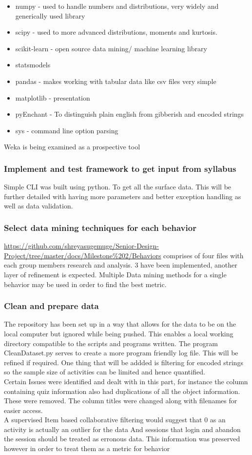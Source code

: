 \documentclass[12pt]{article}
\begin{document}
		\begin{itemize}
			\item numpy - used to handle numbers and distributions, very widely and generically used library
			\item scipy - used to more advanced distributions, moments and kurtosis.
			\item scikit-learn - open source data mining/ machine learning library
			\item statsmodels 
			\item pandas - makes working with tabular data like csv files very simple
			\item matplotlib - presentation
			\item pyEnchant  - To distinguish plain english from gibberish and encoded strings
			\item sys - command line option parsing
		\end{itemize}
		Weka is being examined as a prospective tool
		
		\subsubsection{Implement and test framework to get input from syllabus}
		Simple CLI was built using python. To get all the surface data. This will be further detailed with having more parameters and better exception handling as well as data validation.
		\subsubsection{Select data mining techniques for each behavior}
		\url{https://github.com/shreyasugemuge/Senior-Design-Project/tree/master/docs/Milestone\%202/Behaviors} comprises of four files with each group members research and analysis. 3 have been implemented, another layer of refinement is expected. Multiple Data mining methods for a single behavior may be used in order to find the best metric.
		\subsubsection{Clean and prepare data}
		The repository has been set up in a way that allows for the data to be on the local computer but ignored while being pushed. This enables a local working directory compatible to the scripts and programs written. The program CleanDataset.py serves to create a more program friendly log file. This will be refined if required. One thing that will be addded is filtering for encoded strings so the sample size of activities can be limited and hence quantified.  \\ \hfil \break
		Certain Issues were identified and dealt with in this part, for instance the column containing quiz information also had duplications of all the object information. These were removed. The column titles were changed along with filenames for easier access. \\ \hfil \break
		A supervised Item based collaborative filtering would suggest that 0 as an activity is actually an outlier for the data And sessions that login and abandon the session should be treated as erronous data. This information was preserved however in order to treat them as a metric for behavior
\end{document}
